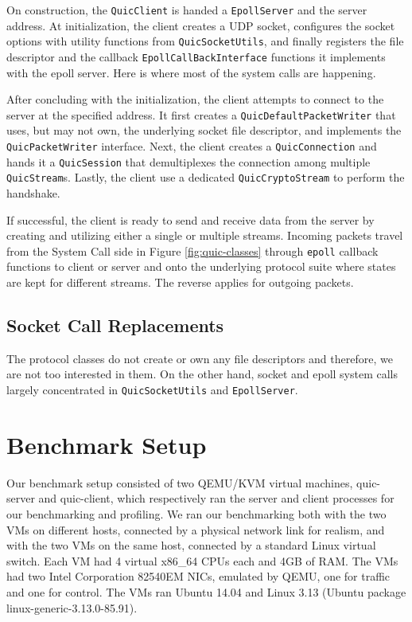 \documentclass{sig-alternate-05-2015}
\begin{document}
On construction, the \texttt{QuicClient} is handed a \texttt{EpollServer} and the server address. At initialization, the client creates a UDP socket, configures the socket options with utility functions from \texttt{QuicSocketUtils}, and finally registers the file descriptor and the callback \texttt{EpollCallBackInterface} functions it implements with the epoll server. Here is where most of the system calls are happening. 

After concluding with the initialization, the client attempts to connect to the server at the specified address. It first creates a                   \texttt{QuicDefaultPacketWriter} that uses, but may not own, the underlying socket file descriptor, and implements the \texttt{QuicPacketWriter} interface. Next, the client creates a \texttt{QuicConnection} and hands it a \texttt{QuicSession} that demultiplexes the connection among multiple \texttt{QuicStream}s. Lastly, the client use a dedicated \texttt{QuicCryptoStream} to perform the handshake.

If successful, the client is ready to send and receive data from the server by creating and utilizing either a single or multiple streams. Incoming packets travel from the System Call side in Figure \ref{fig:quic-classes} through \texttt{epoll} callback functions to client or server and onto the underlying protocol suite where states are kept for different streams. The reverse applies for outgoing packets.

\subsection{Socket Call Replacements}
The protocol classes do not create or own any file descriptors and therefore, we are not too interested in them. On the other hand, socket and epoll system calls largely concentrated in \texttt{QuicSocketUtils} and \texttt{EpollServer}. 


\section{Benchmark Setup}
Our benchmark setup consisted of two QEMU/KVM virtual machines,
quic-server and quic-client,
which respectively ran the server and client processes for our benchmarking and profiling.
We ran our benchmarking both with the two VMs on different hosts,
connected by a physical network link for realism,
and with the two VMs on the same host, connected by a standard Linux virtual switch.
Each VM had 4 virtual x86\_64 CPUs each and 4GB of RAM. 
The VMs had two Intel Corporation 82540EM NICs, emulated by QEMU,
one for traffic and one for control.
The VMs ran Ubuntu 14.04
and Linux 3.13 (Ubuntu package linux-generic-3.13.0-85.91).
\end{document}
